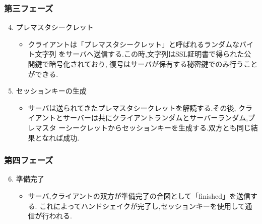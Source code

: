 \documentclass[dvipdfmx,autodetect-engine,titlepage]{jsarticle}
\begin{document}
\subsubsection*{第三フェーズ}

\begin{enumerate}
  \setcounter{enumi}{3}
  \item プレマスタシークレット
  \begin{itemize}
    \item[] クライアントは「プレマスタシークレット」と呼ばれるランダムなバイト文字列
            をサーバへ送信する.この時,文字列はSSL証明書で得られた公開鍵で暗号化されており,
            復号はサーバが保有する秘密鍵でのみ行うことができる.
  \end{itemize}
  \item セッションキーの生成
  \begin{itemize}
    \item[] サーバは送られてきたプレマスタシークレットを解読する.その後,
            クライアントとサーバーは共にクライアントランダムとサーバーランダム,プレマスタ
            ーシークレットからセッションキーを生成する.双方とも同じ結果となれば成功.
  \end{itemize}
\end{enumerate}

\subsubsection*{第四フェーズ}

\begin{enumerate}
  \setcounter{enumi}{5}
  \item 準備完了
  \begin{itemize}
    \item[] サーバ,クライアントの双方が準備完了の合図として「finished」を送信する.
            これによってハンドシェイクが完了し,セッションキーを使用して通信が行われる.
  \end{itemize}
\end{enumerate}
\end{document}
